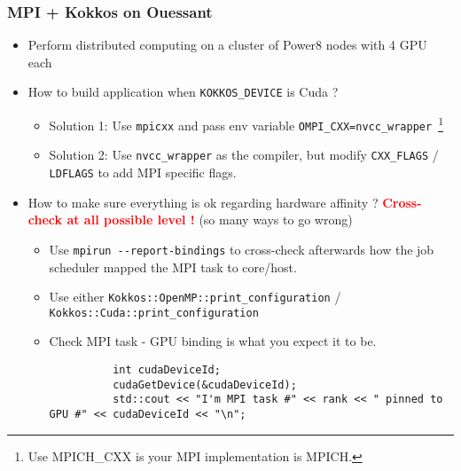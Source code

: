 \begin{frame}[fragile=singleslide]
  \frametitle{MPI + Kokkos on Ouessant}

  \begin{itemize}
  \item Perform distributed computing on a cluster of Power8 nodes with 4 GPU each
  \item How to build application when \texttt{KOKKOS\_DEVICE} is Cuda ?
    \begin{itemize}
    \item Solution 1: Use \texttt{mpicxx} and pass env variable \texttt{OMPI\_CXX=nvcc\_wrapper}~\footnote{Use MPICH\_CXX is your MPI implementation is MPICH.}
    \item Solution 2: Use \texttt{nvcc\_wrapper} as the compiler, but modify \texttt{CXX\_FLAGS} / \texttt{LDFLAGS} to add MPI specific flags.
    \end{itemize}
  \item How to make sure everything is ok regarding hardware affinity ? 
    \textcolor{red}{\textbf{Cross-check at all possible level !}} (so many ways to go wrong)
    \begin{itemize}
    \item Use \texttt{mpirun \--\--report-bindings} to cross-check afterwards how the job scheduler mapped the MPI task to core/host.
    \item Use either \texttt{Kokkos::OpenMP::print\_configuration} / \texttt{Kokkos::Cuda::print\_configuration}
    \item Check MPI task - GPU binding is what you expect it to be.
      {\small
        \begin{verbatim}
          int cudaDeviceId;
          cudaGetDevice(&cudaDeviceId);
          std::cout << "I'm MPI task #" << rank << " pinned to GPU #" << cudaDeviceId << "\n";
        \end{verbatim}
      }
    \end{itemize} 
  \end{itemize}

\end{frame}

